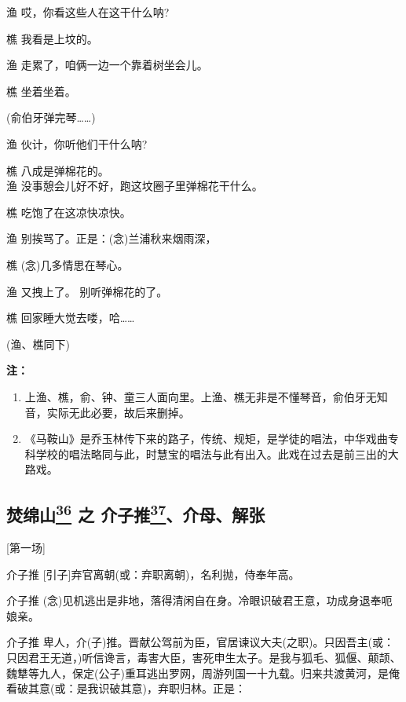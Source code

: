 渔 哎，你看这些人在这干什么呐?

樵 我看是上坟的。

渔 走累了，咱俩一边一个靠着树坐会儿。

樵 坐着坐着。

(俞伯牙弹完琴\ldots{}\ldots{})

渔 伙计，你听他们干什么呐?

樵 八成是弹棉花的。\\
渔 没事憩会儿好不好，跑这坟圈子里弹棉花干什么。

樵 吃饱了在这凉快凉快。

渔 别挨骂了。正是：(念)兰浦秋来烟雨深，

樵 (念)几多情思在琴心。

渔 又拽上了。 别听弹棉花的了。

樵 回家睡大觉去喽，哈\ldots{}\ldots{}

(渔、樵同下)

\textbf{注：}

\begin{enumerate}
\def\labelenumi{\arabic{enumi}.}
\item
  上渔、樵，俞、钟、童三人面向里。上渔、樵无非是不懂琴音，俞伯牙无知音，实际无此必要，故后来删掉。
\item
  《马鞍山》是乔玉林传下来的路子，传统、规矩，是学徒的唱法，中华戏曲专科学校的唱法略同与此，时慧宝的唱法与此有出入。此戏在过去是前三出的大路戏。
\end{enumerate}

\hypertarget{ux711aux7ef5ux5c71-ux4e4b-ux4ecbux5b50ux63a8ux4ecbux6bcdux89e3ux5f20}{%
\subsection{\texorpdfstring{焚绵山\protect\hyperlink{fn36}{\textsuperscript{36}}
之
介子推\protect\hyperlink{fn37}{\textsuperscript{37}}、介母、解张}{焚绵山36 之 介子推37、介母、解张}}\label{ux711aux7ef5ux5c71-ux4e4b-ux4ecbux5b50ux63a8ux4ecbux6bcdux89e3ux5f20}}

{[}第一场{]}

介子推 {[}引子{]}弃官离朝(或：弃职离朝)，名利抛，侍奉年高。

介子推
(念)见机逃出是非地，落得清闲自在身。冷眼识破君王意，功成身退奉呃娘亲。

介子推
卑人，介(子)推。晋献公驾前为臣，官居谏议大夫(之职)。只因吾主(或：只因君王无道，)听信谗言，毒害大臣，害死申生太子。是我与狐毛、狐偃、颠颉、魏犨等九人，保定(公子)重耳逃出罗网，周游列国一十九载。归来共渡黄河，是俺看破其意(或：是我识破其意)，弃职归林。正是：

